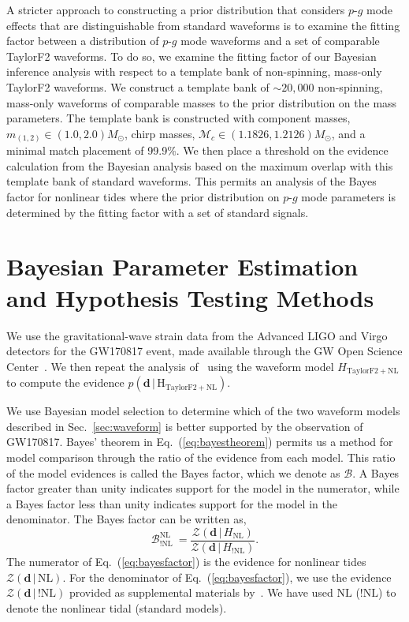 A stricter approach to constructing a prior distribution that considers $p$-$g$ mode effects that are distinguishable from standard waveforms is to examine the fitting factor between a distribution of $p$-$g$ mode waveforms and a set of comparable TaylorF2 waveforms. To do so, we examine the fitting factor of our Bayesian inference analysis with respect to a template bank of non-spinning, mass-only TaylorF2 waveforms. We construct a template bank of $\sim 20,000$ non-spinning, mass-only waveforms of comparable masses to the prior distribution on the mass parameters. The template bank is constructed with component masses, $m_{(1,2)} \in (1.0, 2.0) M_{\odot}$, chirp masses, $\mathcal{M}_c \in (1.1826, 1.2126) M_{\odot}$, and a minimal match placement of 99.9\%. We then place a threshold on the evidence calculation from the Bayesian analysis based on the maximum overlap with this template bank of standard waveforms. This permits an analysis of the Bayes factor for nonlinear tides where the prior distribution on $p$-$g$ mode parameters is determined by the fitting factor with a set of standard signals.

\section{Bayesian Parameter Estimation and Hypothesis Testing Methods} \label{sec:methods}
We use the gravitational-wave strain data from the Advanced LIGO and Virgo detectors for the GW170817 event, made available through the GW Open Science Center~\citep{Vallisneri:2014vxa,gw170817-losc}. We then repeat the analysis of~\cite{de2018tidal} using the waveform model $H_\mathrm{TaylorF2+NL}$ to compute the evidence $p(\mathbf{d}\, | \, \mathrm{H}_\mathrm{TaylorF2+NL})$.

We use Bayesian model selection to determine which of the two waveform models described in Sec.~\ref{sec:waveform} is better supported by the observation of GW170817. Bayes' theorem in Eq.~(\ref{eq:bayestheorem}) permits us a method for model comparison through the ratio of the evidence from each model. This ratio of the model evidences is called the Bayes factor, which we denote as $\mathcal{B}$. A Bayes factor greater than unity indicates support for the model in the numerator, while a Bayes factor less than unity indicates support for the model in the denominator. The Bayes factor can be written as,
\begin{equation}
  \mathcal{B}^{\mathrm{NL}}_{\mathrm{!NL}} \ = \frac{\mathcal{Z}(\mathbf{d} \, | \, H_\mathrm{NL})}{\mathcal{Z}(\mathbf{d} \, | \, H_\mathrm{!NL})}.
\end{equation}\label{eq:bayesfactor}
The numerator of Eq.~(\ref{eq:bayesfactor}) is the evidence for nonlinear tides $\mathcal{Z} (\mathbf{d} \, | \, \mathrm{NL})$. For the denominator of Eq.~(\ref{eq:bayesfactor}), we use the evidence $\mathcal{Z}(\mathbf{d} \, | \, \mathrm{!NL})$ provided as supplemental materials by~\citep{de2018tidal}. We have used $\mathrm{NL}$ ($\mathrm{!NL}$) to denote the nonlinear tidal (standard models).

